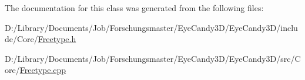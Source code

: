 The documentation for this class was generated from the following files\+:\begin{DoxyCompactItemize}
\item 
D\+:/\+Library/\+Documents/\+Job/\+Forschungsmaster/\+Eye\+Candy3\+D/\+Eye\+Candy3\+D/include/\+Core/\mbox{\hyperlink{_freetype_8h}{Freetype.\+h}}\item 
D\+:/\+Library/\+Documents/\+Job/\+Forschungsmaster/\+Eye\+Candy3\+D/\+Eye\+Candy3\+D/src/\+Core/\mbox{\hyperlink{_freetype_8cpp}{Freetype.\+cpp}}\end{DoxyCompactItemize}
